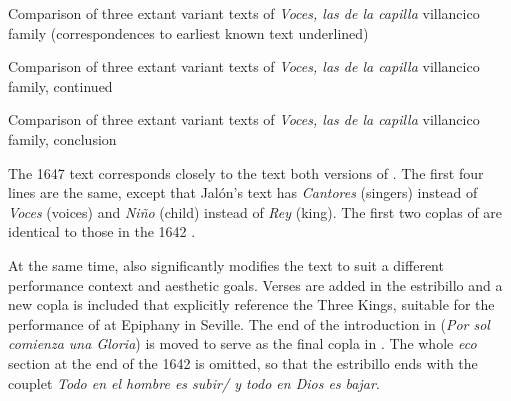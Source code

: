 \begin{table}
    \caption{Comparison of three extant variant texts of \emph{Voces, las de la
    capilla} villancico family (correspondences to earliest known text
    underlined)}

    \label{tab:Voces-versions-1}
\end{table}

\begin{table}
    \caption{Comparison of three extant variant texts of \emph{Voces, las de la
    capilla} villancico family, continued}

    \label{tab:Voces-versions-2}
\end{table}

\begin{table}
    \caption{Comparison of three extant variant texts of \emph{Voces, las de la
    capilla} villancico family, conclusion}

    \label{tab:Voces-versions-3}
\end{table}



The 1647  text corresponds closely to the text both versions of
.
The first four lines are the same, except that Jalón's text has \emph{Cantores}
(singers) instead of \emph{Voces} (voices) and \emph{Niño} (child) instead of
\emph{Rey} (king).
The first two coplas of  are identical to those in the 1642
.

At the same time,  also significantly modifies the text to suit
a different performance context and aesthetic goals.
Verses are added in the estribillo and a new copla is included that explicitly
reference the Three Kings, suitable for the performance of  at
Epiphany in Seville.
The end of the introduction in  (\emph{Por sol comienza una
Gloria}) is moved to serve as the final copla in .
The whole \emph{eco} section at the end of the 1642  is omitted,
so that the estribillo ends with the couplet \emph{Todo en el hombre es subir/ y
todo en Dios es bajar}.

